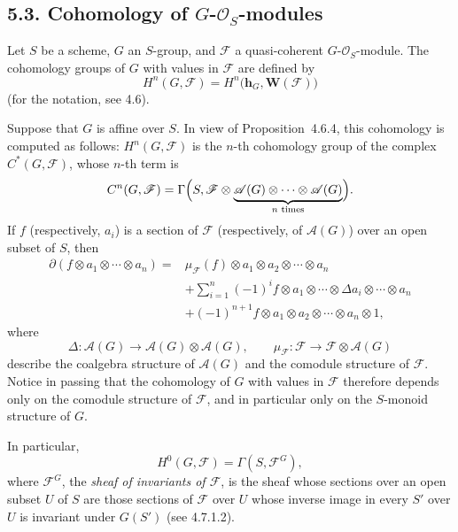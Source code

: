 \subsection*{5.3. Cohomology of \(G\)-\(\mathscr O_S\)-modules}

Let \(S\) be a scheme, \(G\) an \(S\)-group, and \(\mathscr F\) a
quasi-coherent \(G\)-\(\mathscr O_S\)-module. The cohomology groups of
\(G\) with values in \(\mathscr F\) are defined by
\[
  H^n(G,\mathscr F)
    =H^n\bigl(\mathbf h_G,\mathbf W(\mathscr F)\bigr)
\]
(for the notation, see 4.6).

Suppose that \(G\) is affine over \(S\). In view of Proposition~4.6.4,
this cohomology is computed as follows: \(H^n(G,\mathscr F)\) is the
\(n\)-th cohomology group of the complex \(C^*(G,\mathscr F)\), whose
\(n\)-th term is
\[
  C^n(G,\mathscr F)
    =\Gamma\Bigl(
       S,
       \mathscr F\otimes
       \underbrace{\mathscr A(G)\otimes\cdots\otimes\mathscr A(G)}_
                   {n\text{ times}}
     \Bigr).
\]
If \(f\) (respectively, \(a_i\)) is a section of \(\mathscr F\)
(respectively, of \(\mathscr A(G)\)) over an open subset of \(S\), then
\begin{align*}
  \partial(f\otimes a_1\otimes\cdots\otimes a_n)
    ={}&\mu_{\mathscr F}(f)\otimes a_1\otimes a_2\otimes\cdots\otimes a_n\\
     &+\sum_{i=1}^{n}(-1)^i
       f\otimes a_1\otimes\cdots\otimes\Delta a_i\otimes\cdots\otimes a_n\\
     &+(-1)^{n+1}
       f\otimes a_1\otimes a_2\otimes\cdots\otimes a_n\otimes1,
\end{align*}
where
\[
  \Delta:\mathscr A(G)\longrightarrow\mathscr A(G)\otimes\mathscr A(G),
  \qquad
  \mu_{\mathscr F}:\mathscr F\longrightarrow
    \mathscr F\otimes\mathscr A(G)
\]
describe the coalgebra structure of \(\mathscr A(G)\) and the comodule
structure of \(\mathscr F\). Notice in passing that the cohomology of
\(G\) with values in \(\mathscr F\) therefore depends only on the
comodule structure of \(\mathscr F\), and in particular only on the
\(S\)-monoid structure of \(G\).

In particular,
\[
  H^0(G,\mathscr F)=\Gamma(S,\mathscr F^G),
\]
where \(\mathscr F^G\), the \emph{sheaf of invariants of \(\mathscr F\)},
is the sheaf whose sections over an open subset \(U\) of \(S\) are those
sections of \(\mathscr F\) over \(U\) whose inverse image in every
\(S'\) over \(U\) is invariant under \(G(S')\) (see 4.7.1.2).

